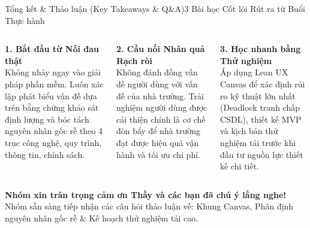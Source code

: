 \documentclass[aspectratio=169, 10pt]{beamer}
\begin{document}
\begin{frame}[t]{Tổng kết \& Thảo luận (Key Takeaways \& Q\&A)}{3 Bài học Cốt lõi Rút ra từ Buổi Thực hành}
  \vspace{-0.1cm}
  \begin{columns}[T]
      \begin{neutralBox}
        \scriptsize
        \textbf{\color{PrimaryBlue}1. Bắt đầu từ Nỗi đau thật}\\
        Không nhảy ngay vào giải pháp phần mềm. Luôn xác lập phát biểu vấn đề dựa trên bằng chứng khảo sát định lượng và bóc tách nguyên nhân gốc rễ theo 4 trục công nghệ, quy trình, thông tin, chính sách.
      \end{neutralBox}

      \begin{neutralBox}
        \scriptsize
        \textbf{\color{SecondaryTeal}2. Cầu nối Nhân quả Rạch ròi}\\
        Không đánh đồng vấn đề người dùng với vấn đề của nhà trường. Trải nghiệm người dùng được cải thiện chính là cơ chế đòn bẩy để nhà trường đạt được hiệu quả vận hành và tối ưu chi phí.
      \end{neutralBox}

      \begin{neutralBox}
        \scriptsize
        \textbf{\color{WarningAmber}3. Học nhanh bằng Thử nghiệm}\\
        Áp dụng Lean UX Canvas để xác định rủi ro kỹ thuật lớn nhất (Deadlock tranh chấp CSDL), thiết kế MVP và kịch bản thử nghiệm tải trước khi đầu tư nguồn lực thiết kế chi tiết.
      \end{neutralBox}
  \end{columns}

  \vspace{0.25cm}
  \begin{tcolorbox}[colback=NavyDark!5!white, colframe=NavyDark, arc=1.5mm, boxrule=0.6pt, left=3mm, right=3mm, top=2mm, bottom=2mm]
    \centering\footnotesize
    \textbf{Nhóm xin trân trọng cảm ơn Thầy và các bạn đã chú ý lắng nghe!}\\[0.05cm]
    \scriptsize\textcolor{MutedText}{Nhóm sẵn sàng tiếp nhận các câu hỏi thảo luận về: Khung Canvas, Phân định nguyên nhân gốc rễ \& Kế hoạch thử nghiệm tải cao.}
  \end{tcolorbox}
\end{frame}
\end{document}
